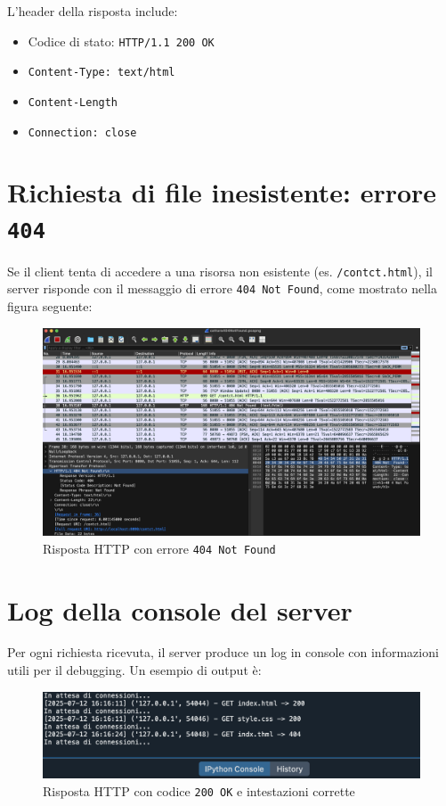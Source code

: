 \documentclass[a4paper,12pt]{report}
\begin{document}
L’header della risposta include:
\begin{itemize}
    \item Codice di stato: \texttt{HTTP/1.1 200 OK}
    \item \texttt{Content-Type: text/html}
    \item \texttt{Content-Length}
    \item \texttt{Connection: close}
\end{itemize}

\section{Richiesta di file inesistente: errore \texttt{404}}

Se il client tenta di accedere a una risorsa non esistente (es. \texttt{/contct.html}), il server risponde con il messaggio di errore \texttt{404 Not Found}, come mostrato nella figura seguente:

\begin{figure}[H]
    \centering
    \includegraphics[width=1.0\textwidth]{Images/404NotFound.png}
    \caption{Risposta HTTP con errore \texttt{404 Not Found}}
\end{figure}

\section{Log della console del server}

Per ogni richiesta ricevuta, il server produce un log in console con informazioni utili per il debugging. Un esempio di output è:
\begin{figure}[H]
    \centering
    \includegraphics[width=1.0\textwidth]{Images/consoleLog.png}
    \caption{Risposta HTTP con codice \texttt{200 OK} e intestazioni corrette}
\end{figure}
\end{document}
